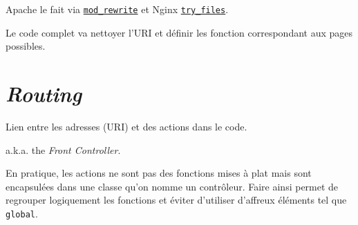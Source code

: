 Apache le fait via
\href{https://httpd.apache.org/docs/current/mod/mod_rewrite.html}{\textenglish{\texttt{mod\_rewrite}}}
et Nginx
\href{http://nginx.org/en/docs/http/ngx_http_core_module.html\#try_files}{\textenglish{\texttt{try\_files}}}.

\begin{english}

\begin{Shaded}
\begin{Highlighting}[]


\NormalTok{ = }\OtherTok{[}\OtherTok{],}
\NormalTok{ = }\OtherTok{[];}

\OtherTok{(}
    \OtherTok{,}
    \OtherTok{,}
\OtherTok{)}  \OtherTok{(}\OtherTok{);}

 \OtherTok{(}
    \OtherTok{[}\OtherTok{],}
    \OtherTok{[}\OtherTok{[}\OtherTok{]]}
\OtherTok{);}
\end{Highlighting}
\end{Shaded}

\end{english}

Le code complet va nettoyer l'URI et définir les fonction correspondant
aux pages possibles.

\hypertarget{routing}{%
\section{\texorpdfstring{\emph{Routing}}{Routing}}\label{routing}}

Lien entre les adresses (URI) et des actions dans le code.

a.k.a. the \emph{Front Controller}.

En pratique, les actions ne sont pas des fonctions mises à plat mais
sont encapsulées dans une classe qu'on nomme un contrôleur. Faire ainsi
permet de regrouper logiquement les fonctions et éviter d'utiliser
d'affreux éléments tel que \textenglish{\texttt{global}}.

